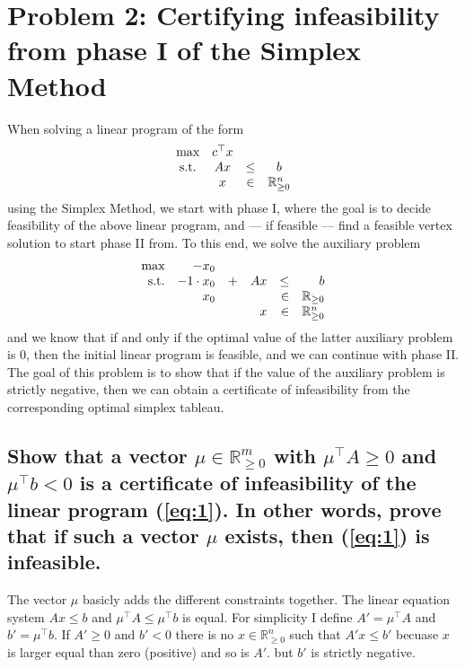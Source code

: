 \documentclass[12pt, a4]{article}
\begin{document}
{\section{Problem 2: Certifying infeasibility from phase I of the Simplex Method }
When solving a linear program of the form
\begin{equation}{\label{eq:1}}
\begin{matrix}
	\text{max}& c^\top x &  & \\ 
	\text{s.t.} & Ax &\leq  &b \\ 
	&  x&\in  & \mathbb{R}^n_{\geq0} 
\end{matrix}
\end{equation}
using the Simplex Method, we start with phase I, where the goal is to decide feasibility of the above linear program, and --- if feasible --- find a feasible vertex solution to start phase II from. To this end, we solve the auxiliary problem
\begin{equation}{\label{eq:2}}
	\begin{matrix*}[r]
		\text{max}& -x_0 &&&  & \\ 
		\text{s.t.} & -1 \cdot x_0 & + & Ax &\leq& b \\ 
		&x_0&&&\in&\mathbb{R}_{\geq0} \\
		&&&x&\in&\mathbb{R}^n_{\geq0} \\
	\end{matrix*}
\end{equation}
and we know that if and only if the optimal value of the latter auxiliary problem is $0$, then the initial linear program is feasible, and we can continue with phase II. The goal of this problem is to show that if the value of the auxiliary problem is strictly negative, then we can obtain a certificate of infeasibility from the corresponding optimal simplex tableau.

\subsection{Show that a vector $\mu \in \mathbb{R}^m_{\geq0}$ with $\mu^\top A\geq0$ and $\mu^\top b <0$ is a certificate of infeasibility of the linear program (\ref{eq:1}). In other words, prove that if such a vector $\mu$ exists, then (\ref{eq:1}) is infeasible.}{\label{sec:2a}}

The vector $\mu$ basicly adds the different constraints together. The linear equation system $Ax \leq b$ and $\mu^\top A \leq \mu^\top b$ is equal. For simplicity I define $A' = \mu^\top A$ and $b' = \mu^\top b$. If $A' \geq 0$ and $b' < 0$ there is no $x \in \mathbb{R}^n_{\geq 0}$ such that $A'x \leq b'$ becuase $x$ is larger equal than zero (positive) and so is $A'$. but $b'$ is strictly negative.

}
\end{document}
